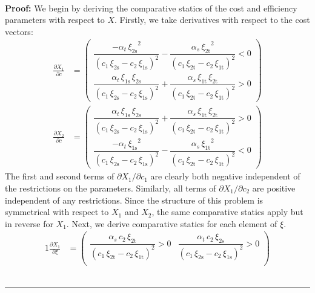 \documentclass[11pt,a4paper,leqno]{extarticle}
\newenvironment{proof}[1][Proof]{\noindent\textbf{#1:} }{\ \rule{0.5em}{0.5em}}
\begin{document}
	
	\hfill \\
	\begin{proof}
		We begin by deriving the comparative statics of the cost and efficiency parameters with respect to $X$.   Firstly, we take derivatives with respect to the cost vectors:
		\begin{align*}
		\frac{\partial X_1}{\partial c} &= 
		\begin{pmatrix}
		\dfrac{-\alpha _{t}\,{\xi _{\mathrm{2s}}}^2}{{\left(c_{1}\,\xi _{\mathrm{2s}}-c_{2}\,\xi _{\mathrm{1s}}\right)}^2}-\dfrac{\alpha _{s}\,{\xi _{\mathrm{2t}}}^2}{{\left(c_{1}\,\xi _{\mathrm{2t}}-c_{2}\,\xi _{\mathrm{1t}}\right)}^2}<0 \\
		\dfrac{\alpha _{t}\,\xi _{\mathrm{1s}}\,\xi _{\mathrm{2s}}}{{\left(c_{1}\,\xi _{\mathrm{2s}}-c_{2}\,\xi _{\mathrm{1s}}\right)}^2}+\dfrac{\alpha _{s}\,\xi _{\mathrm{1t}}\,\xi _{\mathrm{2t}}}{{\left(c_{1}\,\xi _{\mathrm{2t}}-c_{2}\,\xi _{\mathrm{1t}}\right)}^2}>0
		\end{pmatrix}\\
		\frac{\partial X_2}{\partial c} &= 
		\begin{pmatrix}
		\dfrac{\alpha _{t}\,\xi _{\mathrm{1s}}\,\xi _{\mathrm{2s}}}{{\left(c_{1}\,\xi _{\mathrm{2s}}-c_{2}\,\xi _{\mathrm{1s}}\right)}^2}+\dfrac{\alpha _{s}\,\xi _{\mathrm{1t}}\,\xi _{\mathrm{2t}}}{{\left(c_{1}\,\xi _{\mathrm{2t}}-c_{2}\,\xi _{\mathrm{1t}}\right)}^2}>0 \\
		\dfrac{-\alpha _{t}\,{\xi _{\mathrm{1s}}}^2}{{\left(c_{1}\,\xi _{\mathrm{2s}}-c_{2}\,\xi _{\mathrm{1s}}\right)}^2}-\dfrac{\alpha _{s}\,{\xi _{\mathrm{1t}}}^2}{{\left(c_{1}\,\xi _{\mathrm{2t}}-c_{2}\,\xi _{\mathrm{1t}}\right)}^2}<0
		\end{pmatrix}
		\end{align*}
		The first and second terms of $\partial X_1 / \partial c_1$ are clearly both negative independent of the restrictions on the parameters. Similarly, all terms of  $\partial X_1 / \partial c_2$ are positive independent of any restrictions. Since the structure of this problem is symmetrical with respect to $X_1$ and $X_2$, the same comparative statics apply but in reverse for $X_1$. Next, we derive comparative statics for each element of $\xi$.
		\begin{alignat*}{1}
		\frac{\partial X_1}{\partial \xi} &= 
		\begin{pmatrix}
		\dfrac{\alpha _{s}\,c_{2}\,\xi _{\mathrm{2t}}}{{\left(c_{1}\,\xi _{\mathrm{2t}}-c_{2}\,\xi _{\mathrm{1t}}\right)}^2}>0 & \dfrac{\alpha _{t}\,c_{2}\,\xi _{\mathrm{2s}}}{{\left(c_{1}\,\xi _{\mathrm{2s}}-c_{2}\,\xi _{\mathrm{1s}}\right)}^2}>0 \\

\end{pmatrix}
\end{alignat*}
\end{proof}
\end{document}
